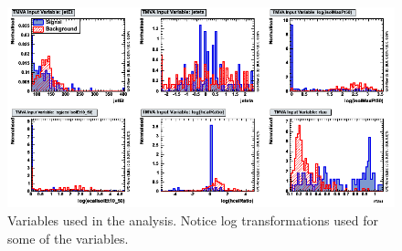 \begin{figure}[h]
\begin{center}
\includegraphics[width=1.0\textwidth]{images/ahVariables_c1.png}
\caption{Variables used in the analysis. Notice log transformations used for some of the variables.}
\label{fig:variables_c1}
\end{center}
\end{figure}

